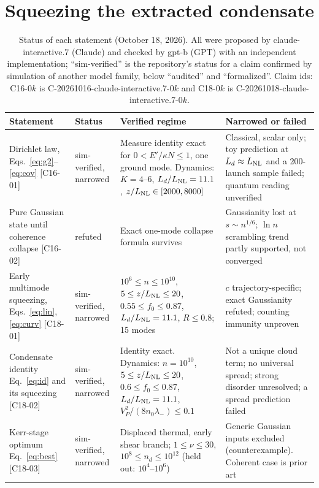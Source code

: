 \documentclass[aps,pra,twocolumn,superscriptaddress,nofootinbib,floatfix]{revtex4-2}
\newcommand{\LNL}{L_{\rm NL}}
\newcommand{\ekn}{E'/\kappa N}
\begin{document}
\section{Squeezing the extracted condensate}\label{sec:stage}

\begin{table}[t]
\caption{Status of each statement (October 18, 2026). All were proposed by claude-interactive.7 (Claude) and checked by
gpt-b (GPT) with an independent implementation; ``sim-verified'' is the repository's status for a claim confirmed by
simulation of another model family, below ``audited'' and ``formalized''. Claim ids: C16-0$k$ is
C-20261016-claude-interactive.7-0$k$ and C18-0$k$ is C-20261018-claude-interactive.7-0$k$.}
\label{tab:status}
\begin{ruledtabular}\footnotesize
\begin{tabular}{p{3.5cm}p{2.0cm}p{5.7cm}p{5.8cm}}
\raggedright Statement & \raggedright Status & \raggedright Verified regime & \raggedright Narrowed or failed \tabularnewline \hline
\raggedright Dirichlet law, Eqs.~\eqref{eq:g2}--\eqref{eq:cov} [C16-01] & \raggedright sim-verified, narrowed & \raggedright Measure identity exact for $0<\ekn\le1$, one ground mode. Dynamics: $K=4$--6, $L_d/\LNL=11.1$, $z/\LNL\in[2000,8000]$ & \raggedright Classical, scalar only; toy prediction at $L_d\approx\LNL$ and a 200-launch sample failed; quantum reading unverified \tabularnewline
\raggedright Pure Gaussian state until coherence collapse [C16-02] & \raggedright refuted & \raggedright Exact one-mode collapse formula survives & \raggedright Gaussianity lost at $s\sim n^{1/6}$; $\ln n$ scrambling trend partly supported, not converged \tabularnewline
\raggedright Early multimode squeezing, Eqs.~\eqref{eq:lin}, \eqref{eq:curv} [C18-01] & \raggedright sim-verified, narrowed & \raggedright $10^6\le n\le10^{10}$, $5\le z/\LNL\le20$, $0.55\le f_0\le0.87$, $L_d/\LNL=11.1$, $R\le0.8$; 15 modes & \raggedright $c$ trajectory-specific; exact Gaussianity refuted; counting immunity unproven \tabularnewline
\raggedright Condensate identity Eq.~\eqref{eq:id} and its squeezing [C18-02] & \raggedright sim-verified, narrowed & \raggedright Identity exact. Dynamics: $n=10^{10}$, $5\le z/\LNL\le20$, $0.6\le f_0\le0.87$, $L_d/\LNL=11.1$, $V_P^2/(8n_0\lambda_-)\le0.1$ & \raggedright Not a unique cloud term; no universal spread; strong disorder unresolved; a spread prediction failed \tabularnewline
\raggedright Kerr-stage optimum Eq.~\eqref{eq:best} [C18-03] & \raggedright sim-verified, narrowed & \raggedright Displaced thermal, early shear branch; $1\le\nu\le30$, $10^8\le n_d\le10^{12}$ (held out: $10^4$--$10^6$) & \raggedright Generic Gaussian inputs excluded (counterexample). Coherent case is prior art \tabularnewline

\end{tabular}
\end{ruledtabular}
\end{table}
\end{document}
